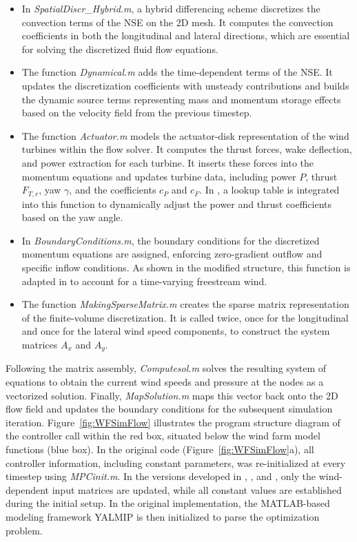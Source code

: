 \begin{itemize}\item In \textit{SpatialDiscr\_Hybrid.m}, a hybrid differencing scheme discretizes the convection terms of the NSE on the 2D mesh. It computes the convection coefficients in both the longitudinal and lateral directions, which are essential for solving the discretized fluid flow equations.
    
    \item The function \textit{Dynamical.m} adds the time-dependent terms of the NSE. It updates the discretization coefficients with unsteady contributions and builds the dynamic source terms representing mass and momentum storage effects based on the velocity field from the previous timestep.
    
    \item The function \textit{Actuator.m} models the actuator-disk representation of the wind turbines within the flow solver. It computes the thrust forces, wake deflection, and power extraction for each turbine. It inserts these forces into the momentum equations and updates turbine data, including power $P$, thrust $F_{T,r}$, yaw $\gamma$, and the coefficients $c_P$ and $c_F$. In \cite{dittmer2023koopman}, a lookup table is integrated into this function to dynamically adjust the power and thrust coefficients based on the yaw angle.
    
    \item In \textit{BoundaryConditions.m}, the boundary conditions for the discretized momentum equations are assigned, enforcing zero-gradient outflow and specific inflow conditions. As shown in the modified structure, this function is adapted in \cite{dittmer2022data} to account for a time-varying freestream wind.
    
    \item The function \textit{MakingSparseMatrix.m} creates the sparse matrix representation of the finite-volume discretization. It is called twice, once for the longitudinal and once for the lateral wind speed components, to construct the system matrices $A_x$ and $A_y$.
\end{itemize}
%
Following the matrix assembly, \textit{Computesol.m} solves the resulting system of equations to obtain the current wind speeds and pressure at the nodes as a vectorized solution. Finally, \textit{MapSolution.m} maps this vector back onto the 2D flow field and updates the boundary conditions for the subsequent simulation iteration. Figure~\ref{fig:WFSimFlow} illustrates the program structure diagram of the controller call within the red box, situated below the wind farm model functions (blue box). In the original code (Figure~\ref{fig:WFSimFlow}a), all controller information, including constant parameters, was re-initialized at every timestep using \textit{MPCinit.m}. In the versions developed in \cite{sharan2022Koopman}, \cite{dittmer2022data}, and \cite{dittmer2023koopman}, only the wind-dependent input matrices are updated, while all constant values are established during the initial setup. In the original implementation, the MATLAB-based modeling framework YALMIP \cite{lofberg2004yalmip} is then initialized to parse the optimization problem. 
